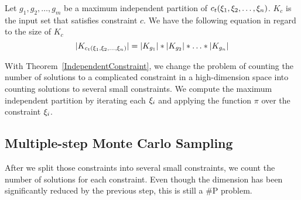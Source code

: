 \begin{theorem}
      \label{IndependentConstraint}
      Let $g_{1}, g_{2}, \ldots, g_{m}$ be a maximum independent partition of
      $c_t({\xi}_{1},{\xi}_{2},\ldots,{\xi}_{n})$.
      $K_c$ is the input set that satisfies constraint $c$. We have the following
      equation in regard to the size of $K_c$
      $$|K_{c_t({\xi}_{1},{\xi}_{2},\ldots,{\xi}_{n})}| = |K_{g_{1}}|*|K_{g_{2}}|*\ldots*|K_{g_{n}}|$$
\end{theorem}
\vspace{-3pt}
With Theorem~\ref{IndependentConstraint}, we change the problem of
counting the number of solutions to a complicated constraint in a high-dimension
space into counting solutions to several small constraints. We compute the
maximum independent partition by iterating each ${\xi}_{i}$ and applying the function
$\pi$ over the constraint ${\xi}_{i}$.



\subsection{Multiple-step Monte Carlo Sampling}

After we split those constraints into several small constraints, we count the
number of solutions for each constraint. Even though the dimension has been
significantly reduced by the previous step, this is still a \#P problem. 


